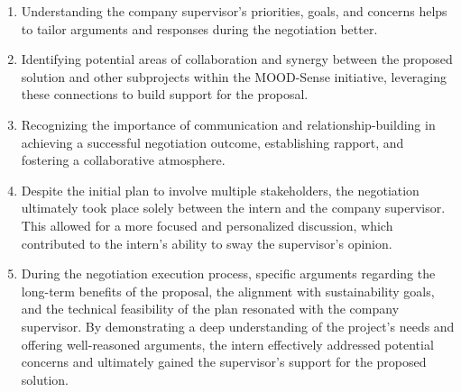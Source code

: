 \begin{enumerate}
    \item Understanding the company supervisor's priorities, goals, and concerns helps to tailor arguments and responses during the negotiation better.
    \item Identifying potential areas of collaboration and synergy between the proposed solution and other subprojects within the MOOD-Sense initiative, leveraging these connections to build support for the proposal.
    \item Recognizing the importance of communication and relationship-building in achieving a successful negotiation outcome, establishing rapport, and fostering a collaborative atmosphere.
    \item Despite the initial plan to involve multiple stakeholders, the negotiation ultimately took place solely between the intern and the company supervisor. This allowed for a more focused and personalized discussion, which contributed to the intern's ability to sway the supervisor's opinion.
    \item During the negotiation execution process, specific arguments regarding the long-term benefits of the proposal, the alignment with sustainability goals, and the technical feasibility of the plan resonated with the company supervisor. By demonstrating a deep understanding of the project's needs and offering well-reasoned arguments, the intern effectively addressed potential concerns and ultimately gained the supervisor's support for the proposed solution.
\end{enumerate}
